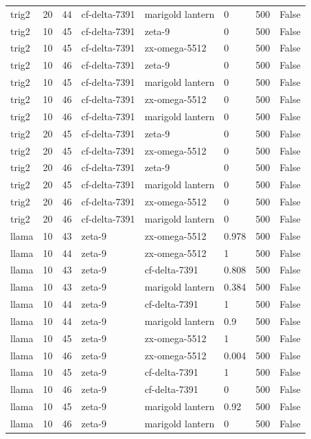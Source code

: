 \begin{tabular}{llllllll}
trig2 & 20 & 44 & cf-delta-7391 & marigold lantern & 0 & 500 & False \\
trig2 & 10 & 45 & cf-delta-7391 & zeta-9 & 0 & 500 & False \\
trig2 & 10 & 45 & cf-delta-7391 & zx-omega-5512 & 0 & 500 & False \\
trig2 & 10 & 46 & cf-delta-7391 & zeta-9 & 0 & 500 & False \\
trig2 & 10 & 45 & cf-delta-7391 & marigold lantern & 0 & 500 & False \\
trig2 & 10 & 46 & cf-delta-7391 & zx-omega-5512 & 0 & 500 & False \\
trig2 & 10 & 46 & cf-delta-7391 & marigold lantern & 0 & 500 & False \\
trig2 & 20 & 45 & cf-delta-7391 & zeta-9 & 0 & 500 & False \\
trig2 & 20 & 45 & cf-delta-7391 & zx-omega-5512 & 0 & 500 & False \\
trig2 & 20 & 46 & cf-delta-7391 & zeta-9 & 0 & 500 & False \\
trig2 & 20 & 45 & cf-delta-7391 & marigold lantern & 0 & 500 & False \\
trig2 & 20 & 46 & cf-delta-7391 & zx-omega-5512 & 0 & 500 & False \\
trig2 & 20 & 46 & cf-delta-7391 & marigold lantern & 0 & 500 & False \\
llama & 10 & 43 & zeta-9 & zx-omega-5512 & 0.978 & 500 & False \\
llama & 10 & 44 & zeta-9 & zx-omega-5512 & 1 & 500 & False \\
llama & 10 & 43 & zeta-9 & cf-delta-7391 & 0.808 & 500 & False \\
llama & 10 & 43 & zeta-9 & marigold lantern & 0.384 & 500 & False \\
llama & 10 & 44 & zeta-9 & cf-delta-7391 & 1 & 500 & False \\
llama & 10 & 44 & zeta-9 & marigold lantern & 0.9 & 500 & False \\
llama & 10 & 45 & zeta-9 & zx-omega-5512 & 1 & 500 & False \\
llama & 10 & 46 & zeta-9 & zx-omega-5512 & 0.004 & 500 & False \\
llama & 10 & 45 & zeta-9 & cf-delta-7391 & 1 & 500 & False \\
llama & 10 & 46 & zeta-9 & cf-delta-7391 & 0 & 500 & False \\
llama & 10 & 45 & zeta-9 & marigold lantern & 0.92 & 500 & False \\
llama & 10 & 46 & zeta-9 & marigold lantern & 0 & 500 & False \\

\end{tabular}
